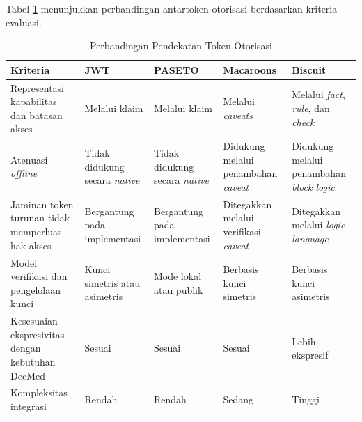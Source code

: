 Tabel \ref{tab:perbandingan-token-otorisasi} menunjukkan perbandingan antartoken otorisasi berdasarkan kriteria evaluasi.

\begin{table}[H]
	\centering
	\caption{Perbandingan Pendekatan Token Otorisasi}
	\label{tab:perbandingan-token-otorisasi}
	\scriptsize
	\begin{tabular}{|p{}|p{}|p{}|p{}|p{}|}
		\hline
		\textbf{Kriteria} & \textbf{JWT}                                             & \textbf{PASETO} & \textbf{Macaroons} & \textbf{Biscuit} \\ \hline
		Representasi kapabilitas dan batasan akses
		                  & Melalui klaim
		                  & Melalui klaim
		                  & Melalui \textit{caveats}
		                  & Melalui \textit{fact}, \textit{rule}, dan \textit{check}                                                           \\ \hline

		Atenuasi \textit{offline}
		                  & Tidak didukung secara \textit{native}
		                  & Tidak didukung secara \textit{native}
		                  & Didukung melalui penambahan \textit{caveat}
		                  & Didukung melalui penambahan \textit{block logic}                                                                   \\ \hline

		Jaminan token turunan tidak memperluas hak akses
		                  & Bergantung pada implementasi
		                  & Bergantung pada implementasi
		                  & Ditegakkan melalui verifikasi \textit{caveat}
		                  & Ditegakkan melalui \textit{logic language}                                                                         \\ \hline

		Model verifikasi dan pengelolaan kunci
		                  & Kunci simetris atau asimetris
		                  & Mode lokal atau publik
		                  & Berbasis kunci simetris
		                  & Berbasis kunci asimetris                                                                                           \\ \hline

		Kesesuaian ekspresivitas dengan kebutuhan DecMed
		                  & Sesuai
		                  & Sesuai
		                  & Sesuai
		                  & Lebih ekspresif                                                                                                    \\ \hline

		Kompleksitas integrasi
		                  & Rendah
		                  & Rendah
		                  & Sedang
		                  & Tinggi                                                                                                             \\ \hline
	\end{tabular}

\end{table}

